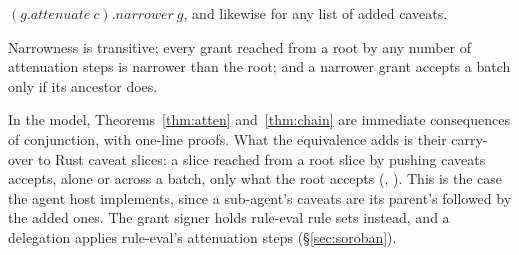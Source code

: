 \begin{mainthm}[Attenuation]\label{thm:atten}
$(g.\mathit{attenuate}\ c).\mathit{narrower}\ g$, and likewise for any list of
added caveats.
\end{mainthm}

\begin{mainthm}[Chaining]\label{thm:chain}
Narrowness is transitive; every grant reached from a root by any number of
attenuation steps is narrower than the root; and a narrower grant accepts a
batch only if its ancestor does.
\end{mainthm}
\noindent In the model, Theorems~\ref{thm:atten} and~\ref{thm:chain} are
immediate consequences of conjunction, with one-line proofs. What the
equivalence adds is their carry-over to Rust caveat slices: a slice reached
from a root slice by pushing caveats accepts, alone or across a batch, only
what the root accepts (,
). This is
the case the agent host implements, since a sub-agent's caveats are its
parent's followed by the added ones. The grant signer holds rule-eval rule
sets instead, and a delegation applies rule-eval's attenuation steps
(\S\ref{sec:soroban}).

